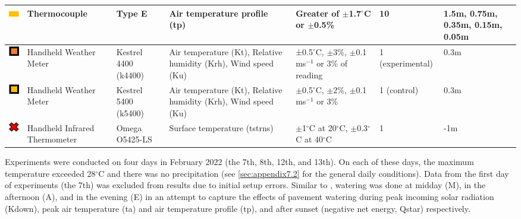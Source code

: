 \documentclass[final,3p,times,authoryear]{elsarticle}
\begin{document}
\begin{table}[!ht]
\begin{tabular}{|p{0.90cm}|p{2.0cm}|p{2.0cm}|p{3.5cm}|p{2.5cm}|p{1.0cm}|p{1.0cm}|}
\includegraphics[trim={0 0 0 0},clip,scale=0.5]{Picture6.png}&Thermocouple&Type E&Air temperature profile (\gls{tp})&Greater of $\pm$1.7$^{\circ}$C or $\pm$0.5\%&10&1.5m, 0.75m, 0.35m, 0.15m, 0.05m \\ \hline     
\includegraphics[trim={0 0 0 0},clip,scale=0.5]{Picture7.png}&Handheld Weather Meter&Kestrel 4400 (k4400)&Air temperature (\gls{Kt}), Relative humidity (\gls{Krh}), Wind speed (\gls{Ku})&±0.5$^{\circ}$C, $\pm$3\%, $\pm$0.1 ms$^{-1}$ or 3\% of reading&1 (experimental)&0.3m \\ \hline
\includegraphics[trim={0 0 0 0},clip,scale=0.5]{Picture8.png}&Handheld Weather Meter&Kestrel 5400 (k5400)&Air temperature (\gls{Kt}), Relative humidity (\gls{Krh}), Wind speed (\gls{Ku})&$\pm$0.5$^{\circ}$C, $\pm$2\%, $\pm$0.1 ms$^{-1}$ or 3\%&1 (control)&0.3m \\ \hline 
\includegraphics[trim={0 0 0 0},clip,scale=0.5]{Picture9.png}&Handheld Infrared Thermometer&Omega O5425-LS&Surface temperature (\gls{tstrns})&$\pm$1$^{\circ}$C at 20$^{\circ}$C, $\pm$0.3$^{\circ}$C at 40$^{\circ}$C&1&-1m \\ \hline           
\end{tabular}\label{table:2.1}
\end{table}



Experiments were conducted on four days in February 2022 (the 7th, 8th, 12th, and 13th). On each of these days, the maximum temperature exceeded 28$^{\circ}$C and there was no precipitation (see \ref{sec:appendix7.2} for the general daily conditions). Data from the first day of experiments (the 7th) was excluded from results due to initial setup errors. Similar to \cite{Middel2021}, watering was done at midday (M), in the afternoon (A), and in the evening (E) in an attempt to capture the effects of pavement watering during peak incoming solar radiation (\gls{Kdown}), peak air temperature (\gls{ta}) and air temperature profile (\gls{tp}), and after sunset (negative net energy, \gls{Qstar}) respectively.
\end{document}
